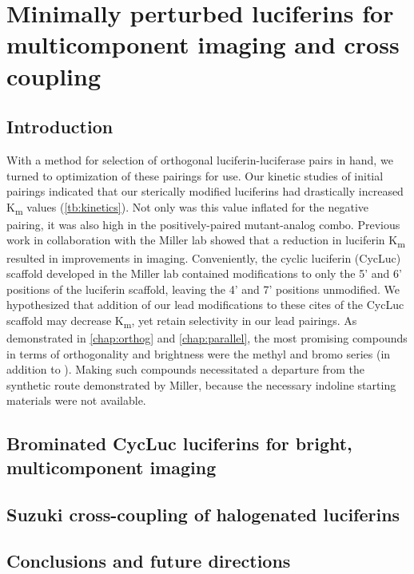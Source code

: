 
\chapter{Minimally perturbed luciferins for multicomponent imaging and cross coupling}
\section{Introduction}
With a method for selection of orthogonal luciferin-luciferase pairs in hand, we turned to optimization of these pairings for \invivo{} use. Our kinetic studies of initial pairings indicated that our sterically modified luciferins had drastically increased K\textsubscript{m} values (\autoref{tb:kinetics}). Not only was this value inflated for the negative pairing, it was also high in the positively-paired mutant-analog combo. Previous work in collaboration with the Miller lab showed that a reduction in luciferin K\textsubscript{m} resulted in improvements in \invivo{} imaging.\cite{RN98}
Conveniently, the cyclic luciferin (CycLuc) scaffold developed in the Miller lab contained modifications to only the 5' and 6' positions of the luciferin scaffold, leaving the 4' and 7' positions unmodified.\cite{RN101,Reddy:2010gaa}
We hypothesized that addition of our lead modifications to these cites of the CycLuc scaffold may decrease K\textsubscript{m}, yet retain selectivity in our lead pairings.
As demonstrated in \autoref{chap:orthog} and \autoref{chap:parallel}, the most promising compounds in terms of orthogonality and brightness were the methyl and bromo series (in addition to \dluc).
Making such compounds necessitated a departure from the synthetic route demonstrated by Miller,\cite{Reddy:2010gaa} because the necessary indoline starting materials were not available.

\section{Brominated CycLuc luciferins for bright, multicomponent imaging}

\section{Suzuki cross-coupling of halogenated luciferins}

\section{Conclusions and future directions}




